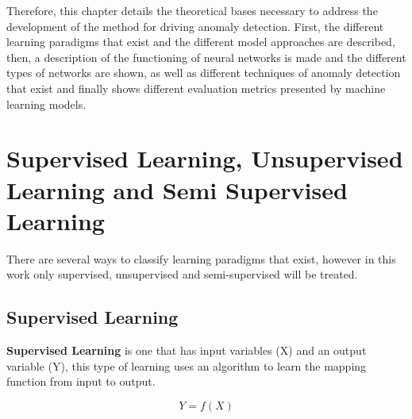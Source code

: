 Therefore, this chapter details the theoretical bases necessary to address the development of the method for driving anomaly detection. First, the different learning paradigms that exist and the different model approaches are described, then, a description of the functioning of neural networks is made and the different types of networks are shown, as well as different techniques of anomaly detection that exist and finally shows different evaluation metrics presented by machine learning models.

\section{Supervised Learning, Unsupervised Learning and Semi Supervised Learning}
\label{section|aprendizaje}

There are several ways to classify learning paradigms that exist, however in this work only supervised, unsupervised and semi-supervised will be treated.

\subsection{Supervised Learning}

\textbf{Supervised Learning} is one that has input variables (X) and an output variable (Y), this type of learning uses an algorithm to learn the mapping function from input to output.

\begin{equation}
Y = f(X)
\end{equation}

